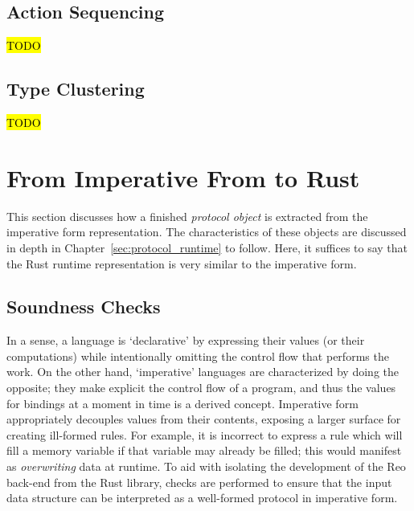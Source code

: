 \subsection{Action Sequencing}
\hl{TODO}


\subsection{Type Clustering}
\hl{TODO}

\section{From Imperative From to Rust}
This section discusses how a finished \textit{protocol object} is extracted from the imperative form representation. The characteristics of these objects are discussed in depth in Chapter~\ref{sec:protocol_runtime} to follow. Here, it suffices to say that the Rust runtime representation is very similar to the imperative form.

\subsection{Soundness Checks}
In a sense, a language is `declarative' by expressing their values (or their computations) while intentionally omitting the control flow that performs the work. On the other hand, `imperative' languages are characterized by doing the opposite; they make explicit the control flow of a program, and thus the values for bindings at a moment in time is a derived concept. Imperative form appropriately decouples values from their contents, exposing a larger surface for creating ill-formed rules. For example, it is incorrect to express a rule which will fill a memory variable if that variable may already be filled; this would manifest as \textit{overwriting} data at runtime. To aid with isolating the development of the Reo back-end from the Rust library, checks are performed to ensure that the input data structure can be interpreted as a well-formed protocol in imperative form. 

